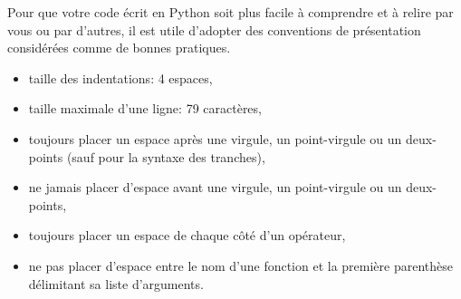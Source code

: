 Pour que votre code écrit en Python soit plus facile à comprendre et à relire par vous ou par d'autres, il est utile d'adopter des conventions de présentation considérées comme de bonnes pratiques. 

\begin{itemize}
  \item taille des indentations: 4 espaces,
  \item  taille maximale d'une ligne: 79 caractères,
  \item toujours placer un espace après une virgule, un point-virgule ou un deux-points (sauf pour la syntaxe des tranches),
  \item ne jamais placer d'espace avant une virgule, un point-virgule ou un deux-points,
  \item toujours placer un espace de chaque côté d'un opérateur,
  \item ne pas placer d'espace entre le nom d'une fonction et la première parenthèse délimitant sa liste d'arguments.
\end{itemize}
